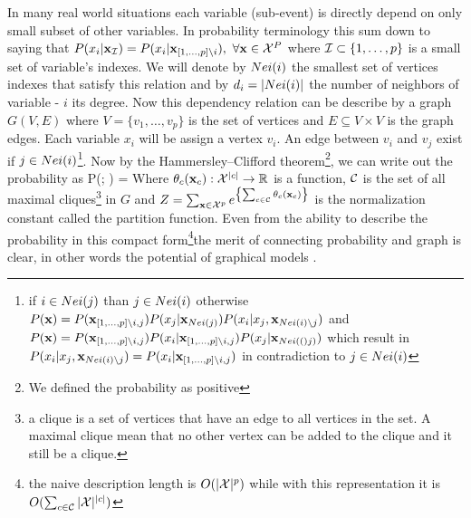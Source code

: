 In many real world situations each variable (sub-event) is directly depend on only small subset of other variables.
In probability terminology this sum down to saying that $P(x_i |{\bf x}_{{\cal I}}) = P(x_i|{\bf x}_{[1,\ldots,p] \setminus i}),\  \forall {\bf x} \in {\cal X}^{P}$ where ${\cal I} \subset \{1,\ldots,p\}$  is a small set of variable's indexes.
We will denote by $Nei(i)$ the smallest set of vertices indexes that satisfy this relation and by $d_i = |Nei(i)|$ the number of neighbors of variable - $i$ its degree.  
Now this dependency relation can be describe by a graph $G(V,E)$ where $V = \{v_1,\ldots, v_p\}$ is the set of vertices and  $E \subseteq V \times V$ is the graph edges.
Each variable $x_i$ will be assign a vertex $v_i$. 
An edge between $v_i$ and $v_j$ exist if  $j \in Nei(i)$\footnote{if $i \in Nei(j)$ than $j \in Nei(i)$ otherwise $P({\bf x}) = P({\bf x}_{[1,\ldots,p]\setminus i,j}) P(x_j|{\bf x}_{Nei(j)}) P(x_i|x_j,{\bf x}_{Nei(i)\setminus j})$ and $P({\bf x}) = P({\bf x}_{[1,\ldots,p]\setminus i,j}) P(x_i|{\bf x}_{[1,\ldots,p]\setminus i,j}) P(x_j|{\bf x}_{Nei(()j)})$ which result in $P(x_i|x_j,{\bf x}_{Nei(i)\setminus j}) =   P(x_i|{\bf x}_{[1,\ldots,p]\setminus i,j})$ in contradiction to $j \in Nei(i)$}.
Now by the Hammersley–Clifford theorem\cite{hammersley1971markov}\footnote{We defined the probability as positive}, we can write out the probability as
\be
\label{eq:ciluqe_prob}
P(\xx; \thetav) =  
\ee
Where $\theta_{c}({\bf x}_{c}): {\cal X}^{|c|} \to \mathbb{R}$  is a function, ${\cal C}$ is the set of all maximal cliques\footnote{a clique is a set of vertices that have an edge to all vertices in the set. A maximal clique mean that no other vertex can be added to the clique and it still be a clique.} in $G$ and $Z = \sum_{{\bf x} \in {\cal X}^p} e^{\left\{\sum_{c \in {\cal C}}\theta_{c}({\bf x}_{c})\right\}}$ is the normalization constant called the partition function.
Even from the ability to describe the probability in this compact form\footnote{the naive description length is $O(|{\cal X}|^p)$ while with this representation it is $O(\sum_{c \in {\cal C}} |{\cal X}|^{|c|})$}the merit of connecting probability and graph is clear, in other words the potential of graphical models \cite{koller2009probabilistic}.


